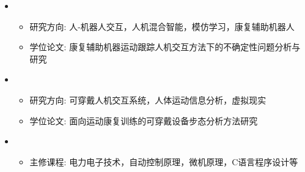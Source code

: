   \begin{itemize}[leftmargin=*]
    \item
      {\small
      \begin{itemize}
        \item{研究方向: 人-机器人交互，人机混合智能，模仿学习，康复辅助机器人}
        \item{学位论文: 康复辅助机器运动跟踪人机交互方法下的不确定性问题分析与研究}
      \end{itemize}}
      
    \item
      {\small
      \begin{itemize}
        \item{研究方向: 可穿戴人机交互系统，人体运动信息分析，虚拟现实}
        \item{学位论文: 面向运动康复训练的可穿戴设备步态分析方法研究}
      \end{itemize}
      }

      \item
      {\small
      \begin{itemize}
        \item{主修课程: 电力电子技术，自动控制原理，微机原理，C语言程序设计等}
      \end{itemize}
      }

  \end{itemize}